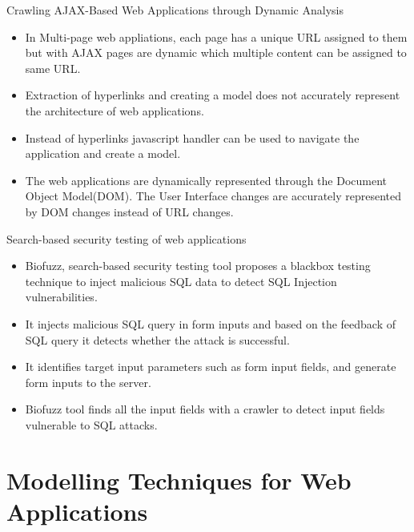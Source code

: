 \documentclass{beamer}
\begin{document}
\begin{frame}{Crawling AJAX-Based Web Applications through Dynamic Analysis}
    \begin{itemize}
    \item In Multi-page web appliations, each page has a unique URL assigned to them but with AJAX pages are dynamic which multiple content can be assigned to same URL. 
    \item Extraction of hyperlinks and creating a model does not accurately represent the architecture of web applications. \\ 
    \item Instead of hyperlinks javascript handler can be used to navigate the application and create a model. 
    \item The web applications are dynamically represented through the Document Object Model(DOM). The User Interface changes are accurately represented by DOM changes instead of URL changes.
    \end{itemize}
\end{frame}

\begin{frame}{Search-based security testing of web applications}
 \begin{itemize}
    \item Biofuzz, search-based security testing tool proposes a blackbox testing technique to inject malicious SQL data to detect SQL Injection vulnerabilities.
    \item It  injects malicious SQL query in form inputs and based on the feedback of SQL query it detects whether the attack is successful.  \\ 
    \item It identifies target input parameters such as form input fields, and generate form inputs to the server. 
    \item Biofuzz tool finds all the input fields with a crawler to detect input fields vulnerable to SQL attacks.
    \end{itemize}
\end{frame}

\section{Modelling Techniques for Web Applications}
\end{document}
